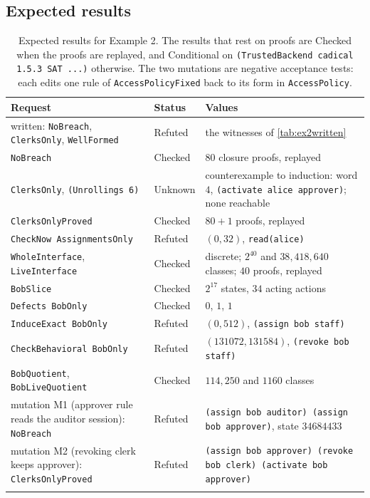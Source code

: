 \documentclass[11pt]{article}
\newcommand{\code}[1]{\texttt{#1}}
\theoremstyle{definition}
\theoremstyle{plain}
\begin{document}
\subsection{Expected results}

\begin{longtable}{>{\raggedright\arraybackslash}p{5.6cm}l>{\raggedright\arraybackslash}p{5.9cm}}
\toprule
Request & Status & Values\\
\midrule
\endhead
written: \code{NoBreach}, \code{ClerksOnly}, \code{WellFormed} & Refuted & the witnesses of \cref{tab:ex2written}\\
\code{NoBreach} & Checked & $80$ closure proofs, replayed\\
\code{ClerksOnly}, \code{(Unrollings 6)} & Unknown & counterexample to induction: word $4$, \code{(activate alice approver)}; none reachable\\
\code{ClerksOnlyProved} & Checked & $80+1$ proofs, replayed\\
\code{CheckNow AssignmentsOnly} & Refuted & $(0,32)$, \code{read(alice)}\\
\code{WholeInterface}, \code{LiveInterface} & Checked & discrete; $2^{40}$ and $38{,}418{,}640$ classes; $40$ proofs, replayed\\
\code{BobSlice} & Checked & $2^{17}$ states, $34$ acting actions\\
\code{Defects BobOnly} & Checked & $0$, $1$, $1$\\
\code{InduceExact BobOnly} & Refuted & $(0,512)$, \code{(assign bob staff)}\\
\code{CheckBehavioral BobOnly} & Refuted & $(131072,131584)$, \code{(revoke bob staff)}\\
\code{BobQuotient}, \code{BobLiveQuotient} & Checked & $114{,}250$ and $1160$ classes\\
mutation M1 (approver rule reads the auditor session): \code{NoBreach} & Refuted & \code{(assign bob auditor) (assign bob approver)}, state $34684433$\\
mutation M2 (revoking clerk keeps approver): \code{ClerksOnlyProved} & Refuted & \code{(assign bob approver) (revoke bob clerk) (activate bob approver)}\\
\bottomrule
\caption{Expected results for Example 2. The results that rest on proofs are Checked when the proofs
are replayed, and Conditional on \code{(TrustedBackend cadical 1.5.3 SAT ...)} otherwise. The two
mutations are negative acceptance tests: each edits one rule of \code{AccessPolicyFixed} back to
its form in \code{AccessPolicy}.}\label{tab:ex2results}
\end{longtable}
\end{document}
